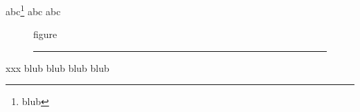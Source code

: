 \documentclass[12pt,a4paper]{article}
\begin{document}
abc\footnote{blub\tagmcend}
\newpage
abc
\tagmcend
{}
abc
\tagmcend
\begin{figure}[b]
figure \rule{1cm}{0.2\textwidth}
\tagmcend
\end{figure}
xxx
\newpage
blub
\newpage
blub
\tagmcend
\newpage
{}blub
\tagmcend
{}blub
\tagmcend
\end{document}
